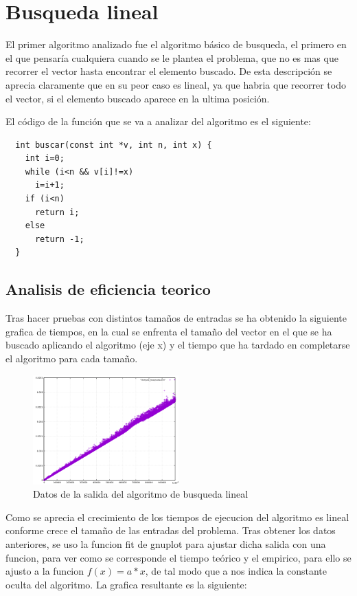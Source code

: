\section{Busqueda lineal}

El primer algoritmo analizado fue el algoritmo b\'asico de busqueda, el primero en el que pensaría cualquiera cuando se le plantea el problema, que no es mas que recorrer el vector hasta encontrar el elemento buscado. De esta descripci\'on se aprecia claramente que en su peor caso es lineal, ya que habria que recorrer todo el vector, si el elemento buscado aparece en la ultima posición.

El código de la función que se va a analizar del algoritmo es el siguiente:

\begin{lstlisting}
  int buscar(const int *v, int n, int x) {
    int i=0;
    while (i<n && v[i]!=x)
      i=i+1;
    if (i<n)
      return i;
    else
      return -1;
  }
\end{lstlisting}

\subsection{Analisis de eficiencia teorico}

Tras hacer pruebas con distintos tamaños de entradas se ha obtenido la siguiente grafica de tiempos, en la cual se enfrenta el tamaño del vector en el que se ha buscado aplicando el algoritmo (eje x) y el tiempo que ha tardado en completarse el algoritmo para cada tamaño.

\begin{figure}[h]
  \centering
  \includegraphics[width=0.5\textwidth]{./Imagenes/busqueda_lineal.png}
  \caption{Datos de la salida del algoritmo de busqueda lineal}
\end{figure}

Como se aprecia el crecimiento de los tiempos de ejecucion del algoritmo es lineal conforme crece el tamaño de las entradas del problema. Tras obtener los datos anteriores, se uso la funcion fit de gnuplot para ajustar dicha salida con una funcion, para ver como se corresponde el tiempo teórico y el empirico, para ello se ajusto a la funcion $ f(x) = a*x$, de tal modo que a nos indica la constante oculta del algoritmo. La grafica resultante es la siguiente:

